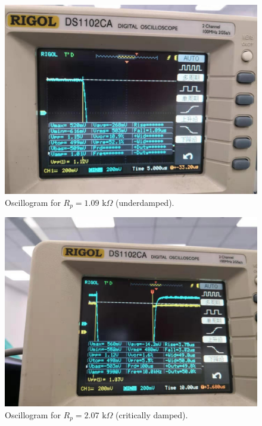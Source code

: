 \documentclass{article}
\begin{document}
\begin{figure}[H]
\centering
\includegraphics[scale=0.15]{3.jpg}
\caption{Oscillogram for $R_p=1.09\,\,\text{k}\Omega$ (underdamped).} \label{FigU2}                                                        \end{figure}

\begin{figure}[H]
\centering
\includegraphics[scale=0.27]{4.jpg}
\caption{Oscillogram for $R_p=2.07\,\,\text{k}\Omega$ (critically damped).}\label{FigC}
\end{figure}
\end{document}
